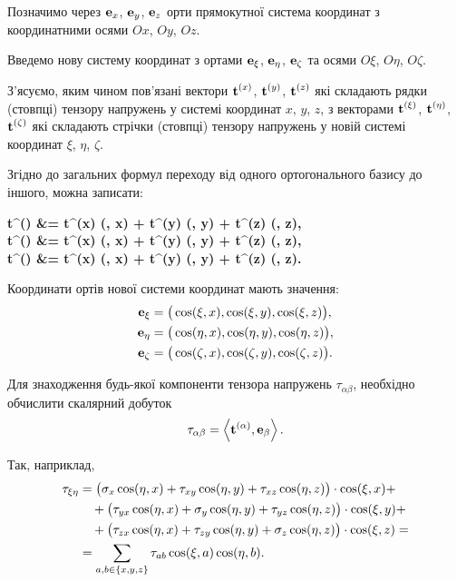 Позначимо через $\bf{e}_x$, $\bf{e}_y$, $\bf{e}_z$ орти прямокутної система координат з координатними осями $Ox$, $Oy$, $Oz$. \medskip 

Введемо нову систему координат з ортами $\bf{e}_\xi$, $\bf{e}_\eta$, $\bf{e}_\zeta$ та осями $O\xi$, $O\eta$, $O\zeta$. \medskip

З'ясуємо, яким чином пов'язані вектори $\bf{t}^{(x)}$, $\bf{t}^{(y)}$, $\bf{t}^{(z)}$ які складають рядки (стовпці) тензору напружень у системі координат $x$, $y$, $z$, з векторами $\bf{t}^{(\xi)}$, $\bf{t}^{(\eta)}$, $\bf{t}^{(\zeta)}$ які складають стрічки (стовпці) тензору напружень у новій системі координат $\xi$, $\eta$, $\zeta$. \medskip

Згідно до загальних формул переходу від одного ортогонального базису до іншого, можна записати:
\begin{system}
	\bf{t}^{(\xi)} &= \bf{t}^{(x)} \cdot \cos (\xi, x) + \bf{t}^{(y)} \cdot \cos (\xi, y) + \bf{t}^{(z)} \cdot \cos (\xi, z), \\
	\bf{t}^{(\eta)} &= \bf{t}^{(x)} \cdot \cos (\eta, x) + \bf{t}^{(y)} \cdot \cos (\eta, y) + \bf{t}^{(z)} \cdot \cos (\eta, z), \\
	\bf{t}^{(\zeta)} &= \bf{t}^{(x)} \cdot \cos (\zeta, x) + \bf{t}^{(y)} \cdot \cos (\zeta, y) + \bf{t}^{(z)} \cdot \cos (\zeta, z).
\end{system}

Координати ортів нової системи координат мають значення:
\begin{align}
	\bf{e}_\xi &= \big( \cos (\xi, x), \cos (\xi, y), \cos (\xi, z) \big), \\
	\bf{e}_\eta &= \big( \cos (\eta, x), \cos (\eta, y), \cos (\eta, z) \big), \\
	\bf{e}_\zeta &= \big( \cos (\zeta, x), \cos (\zeta, y), \cos (\zeta, z) \big).
\end{align}
 
Для знаходження будь-якої компоненти тензора напружень $\tau_{\alpha\beta}$, необхідно обчислити скалярний добуток
\begin{equation}
	\tau_{\alpha \beta} = \langle \bf{t}^{(\alpha)}, \bf{e}_\beta \rangle.
\end{equation}

Так, наприклад,
\begin{equation}
	\begin{aligned}
		\tau_{\xi \eta} &= \big( \sigma_x \cos (\eta, x) + \tau_{x y} \cos (\eta, y) + \tau_{x z} \cos (\eta, z) \big) \cdot \cos (\xi, x) + \\
		&\quad + \big( \tau_{y x} \cos (\eta, x) + \sigma_y \cos (\eta, y) + \tau_{y z} \cos (\eta, z) \big) \cdot \cos (\xi, y) + \\
		&\quad + \big( \tau_{z x} \cos (\eta, x) + \tau_{z y} \cos (\eta, y) + \sigma_z \cos (\eta, z) \big) \cdot \cos (\xi, z) = \\
		&= \Sum_{a, b \in \{x, y, z\}} \tau_{a b} \cos (\xi, a) \cos (\eta, b).
	\end{aligned}
\end{equation}


